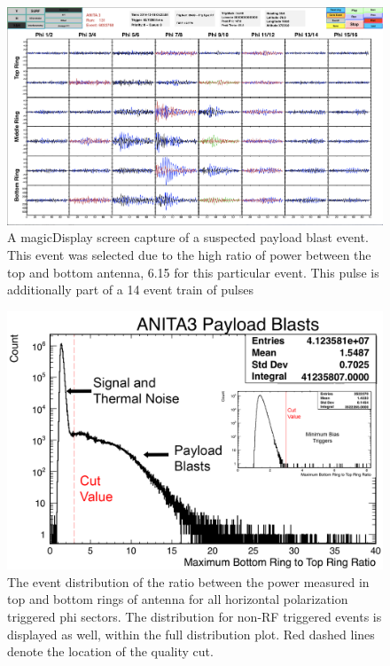 \begin{figure}
	\centering
	\includegraphics[height=0.5\textheight]{figures/payloadBlast}
	\caption{A magicDisplay screen capture of a suspected payload blast event.  This event was selected due to the high ratio of power between the top and bottom antenna, 6.15 for this particular event.  This pulse is additionally part of a 14 event train of pulses}
	\label{fig:payloadBlast}
\end{figure}

\begin{figure}
	\centering
	\includegraphics[height=0.5\textheight]{figures/payloadBlastDistribution}
	\caption{The event distribution of the ratio between the power measured in top and bottom rings of antenna for all horizontal polarization triggered phi sectors.  The distribution for non-RF triggered events is displayed as well, within the full distribution plot.  Red dashed lines denote the location of the quality cut.}
	\label{fig:payloadBlastDist}
\end{figure}
	
